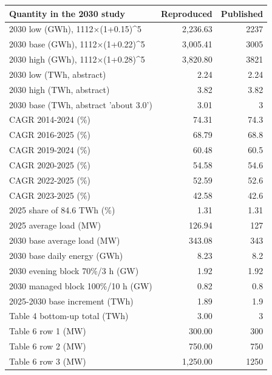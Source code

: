 \begin{tabular}{@{}lrr@{}}
\toprule
Quantity in the 2030 study & Reproduced & Published \\
\midrule
2030 low (GWh), 1112$\times$(1+0.15)\^{}5 & 2,236.63 & 2237 \\
2030 base (GWh), 1112$\times$(1+0.22)\^{}5 & 3,005.41 & 3005 \\
2030 high (GWh), 1112$\times$(1+0.28)\^{}5 & 3,820.80 & 3821 \\
2030 low (TWh, abstract) & 2.24 & 2.24 \\
2030 high (TWh, abstract) & 3.82 & 3.82 \\
2030 base (TWh, abstract 'about 3.0') & 3.01 & 3 \\
CAGR 2014-2024 (\%) & 74.31 & 74.3 \\
CAGR 2016-2025 (\%) & 68.79 & 68.8 \\
CAGR 2019-2024 (\%) & 60.48 & 60.5 \\
CAGR 2020-2025 (\%) & 54.58 & 54.6 \\
CAGR 2022-2025 (\%) & 52.59 & 52.6 \\
CAGR 2023-2025 (\%) & 42.58 & 42.6 \\
2025 share of 84.6 TWh (\%) & 1.31 & 1.31 \\
2025 average load (MW) & 126.94 & 127 \\
2030 base average load (MW) & 343.08 & 343 \\
2030 base daily energy (GWh) & 8.23 & 8.2 \\
2030 evening block 70\%/3 h (GW) & 1.92 & 1.92 \\
2030 managed block 100\%/10 h (GW) & 0.82 & 0.8 \\
2025-2030 base increment (TWh) & 1.89 & 1.9 \\
Table 4 bottom-up total (TWh) & 3.00 & 3 \\
Table 6 row 1 (MW) & 300.00 & 300 \\
Table 6 row 2 (MW) & 750.00 & 750 \\
Table 6 row 3 (MW) & 1,250.00 & 1250 \\
\bottomrule
\end{tabular}
